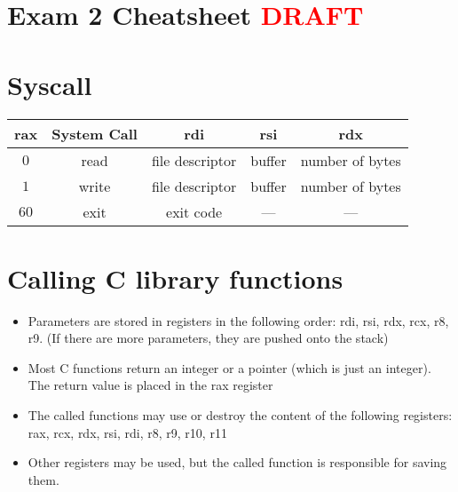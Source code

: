 \documentclass[letterpaper,12pt]{exam}
\newcommand{\unit}{Exam 2 Cheatsheet \textcolor{red}{DRAFT}}
\begin{document}
\section*{\unit}
\section*{Syscall}
\begin{tabular}{| c | c | c | c| c |}
 \hline
    rax & System Call & rdi & rsi & rdx \\
    \hline
    $0$ & read & file descriptor & buffer & number of bytes \\
    \hline
    $1$ & write & file descriptor & buffer & number of bytes \\
    \hline
    $60$ & exit & exit code & --- & --- \\
    \hline
\end{tabular}
\par
\section*{Calling C library functions}

\begin{itemize}
    \item Parameters are stored in registers in the following order: rdi, rsi, rdx, rcx, r8, r9. (If there are more parameters, they are pushed onto the stack)
    \item Most C functions return an integer or a pointer (which is just an integer).  The return value is placed in the rax register
    \item The called functions may use or destroy the content of the following registers: rax, rcx, rdx, rsi, rdi, r8, r9, r10, r11 
    \item Other registers may be used, but the called function is responsible for saving them.
\vspace{5 mm}

\end{itemize}
\par
\end{document}
